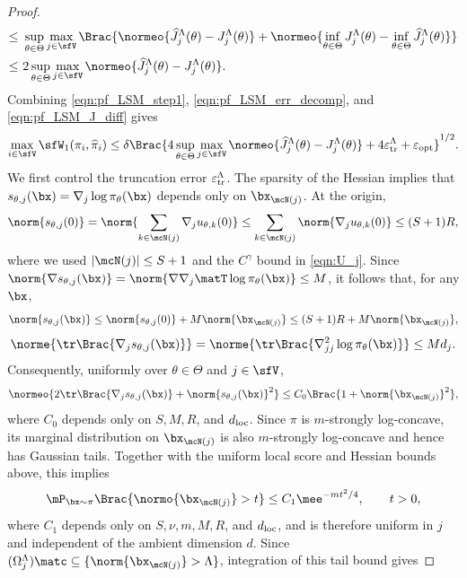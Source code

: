 \documentclass[11pt]{article}
\begin{document}
\begin{proof}
\begin{equation}
\begin{split}
    \le~& \sup_{\theta \in \Theta} \max_{j \in \sfV} \Brac{ \normeo{ \widehat{J}_j^\Lambda(\theta) - J_j^\Lambda(\theta) } + \normeo{ \inf_{\theta \in \Theta} J_j^\Lambda(\theta)- \inf_{\theta \in \Theta} \widehat{J}_j^\Lambda(\theta) } } \\
    \le~& 2 \sup_{\theta \in \Theta} \max_{j \in \sfV} \normeo{ \widehat{J}_j^\Lambda(\theta) - J_j^\Lambda(\theta) }.
\end{split}
\end{equation}
Combining \eqref{eqn:pf_LSM_step1}, \eqref{eqn:pf_LSM_err_decomp}, and \eqref{eqn:pf_LSM_J_diff} gives
\begin{equation}
\label{eqn:pf_LSM_step2}
    \max_{i \in \sfV} \sfW_1(\pi_i,\widehat{\pi}_i) \le \delta \Brac{ 4 \sup_{\theta \in \Theta} \max_{j \in \sfV} \normeo{ \widehat{J}_j^\Lambda(\theta) - J_j^\Lambda(\theta) } + 4 \varepsilon_{\rm tr}^\Lambda + \varepsilon_{\rm opt} }^{1/2}.
\end{equation}
We first control the truncation error $\varepsilon_{\rm tr}^\Lambda$.
The sparsity of the Hessian implies that $s_{\theta,j}(\bx)=\nabla_j\log\pi_\theta(\bx)$ depends only on $\bx_{\mcN(j)}$.
At the origin,
\[
    \norm{s_{\theta,j}(0)} = \norm{ \sum_{k\in\mcN(j)} \nabla_j u_{\theta,k}(0) } \le \sum_{k\in\mcN(j)} \norm{\nabla_j u_{\theta,k}(0)} \le (S+1)R,
\]
where we used $|\mcN(j)|\le S+1$ and the $C^\gamma$ bound in \eqref{eqn:U_j}.
Since $\norm{\nabla s_{\theta,j}(\bx)}=\norm{\nabla\nabla_j\matT\log\pi_\theta(\bx)}\le M$, it follows that, for any $\bx$,
\[
    \norm{ s_{\theta,j}(\bx) } \le \norm{ s_{\theta,j}(0) } + M \norm{\bx_{\mcN(j)}} \le (S+1)R + M \norm{\bx_{\mcN(j)}},
\]
\[
    \norme{ \tr \Brac{ \nabla_j s_{\theta,j}(\bx) } } = \norme{ \tr \Brac{ \nabla_{jj}^2 \log \pi_\theta(\bx) } } \le M d_j.
\]
Consequently, uniformly over $\theta\in\Theta$ and $j\in\sfV$,
\[
    \normeo{2\tr\Brac{\nabla_j s_{\theta,j}(\bx)}+\norm{s_{\theta,j}(\bx)}^2}
    \le C_0\Brac{1+\norm{\bx_{\mcN(j)}}^2},
\]
where $C_0$ depends only on $S,M,R$, and $d_{\rm loc}$.
Since $\pi$ is $m$-strongly log-concave, its marginal distribution on $\bx_{\mcN(j)}$ is also $m$-strongly log-concave and hence has Gaussian tails. Together with the uniform local score and Hessian bounds above, this implies
\[
    \mP_{\bx\sim\pi}\Brac{\normo{\bx_{\mcN(j)}}>t}\le C_1\mee^{-mt^2/4}, \qquad t>0,
\]
where $C_1$ depends only on $S,\nu,m,M,R$, and $d_{\rm loc}$, and is therefore uniform in $j$ and independent of the ambient dimension $d$.
Since $(\Omega_j^\Lambda)\matc\subseteq\{\norm{\bx_{\mcN(j)}}>\Lambda\}$, integration of this tail bound gives

\end{proof}
\end{document}
